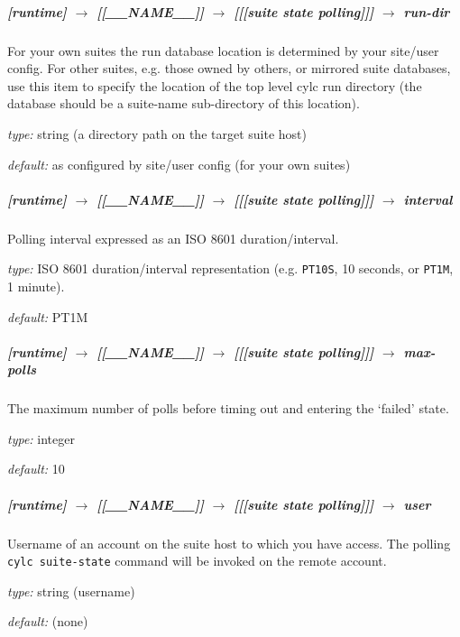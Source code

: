 \subparagraph[run-dir]{[runtime] $\rightarrow$ [[\_\_NAME\_\_]] $\rightarrow$ [[[suite state polling]]] $\rightarrow$ run-dir}

For your own suites the run database location is determined by your
site/user config. For other suites, e.g. those owned by others, or
mirrored suite databases, use this item to specify the location
of the top level cylc run directory (the database should be a
suite-name sub-directory of this location).

\begin{myitemize}
    \item {\em type:} string (a directory path on the target suite host)
    \item {\em default:} as configured by site/user config (for your own suites)
\end{myitemize}

\subparagraph[interval]{[runtime] $\rightarrow$ [[\_\_NAME\_\_]] $\rightarrow$ [[[suite state polling]]] $\rightarrow$ interval}

Polling interval expressed as an ISO 8601 duration/interval.
\begin{myitemize}
    \item {\em type:} ISO 8601 duration/interval representation (e.g.
 \lstinline=PT10S=, 10 seconds, or \lstinline=PT1M=, 1 minute).
    \item {\em default:} PT1M
\end{myitemize}

\subparagraph[max-polls]{[runtime] $\rightarrow$ [[\_\_NAME\_\_]] $\rightarrow$ [[[suite state polling]]] $\rightarrow$ max-polls}

The maximum number of polls before timing out and entering the `failed' state.

\begin{myitemize}
    \item {\em type:} integer
    \item {\em default:} 10
\end{myitemize}

\subparagraph[user]{[runtime] $\rightarrow$ [[\_\_NAME\_\_]] $\rightarrow$ [[[suite state polling]]] $\rightarrow$ user}

Username of an account on the suite host to which you have access. The
polling \lstinline=cylc suite-state= command will be invoked
on the remote account.

\begin{myitemize}
    \item {\em type:} string (username)
    \item {\em default:} (none)
\end{myitemize}

